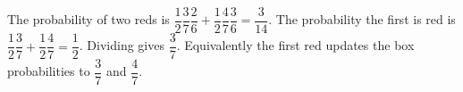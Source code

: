 The probability of two reds is $\dfrac{1}{2}\dfrac{3}{7}\dfrac{2}{6}+\dfrac{1}{2}\dfrac{4}{7}\dfrac{3}{6}=\dfrac{3}{14}$. The probability the first is red is $\dfrac{1}{2}\dfrac{3}{7}+\dfrac{1}{2}\dfrac{4}{7}=\dfrac{1}{2}$. Dividing gives $\boxed{\dfrac{3}{7}}$. Equivalently the first red updates the box probabilities to $\dfrac{3}{7}$ and $\dfrac{4}{7}$.
